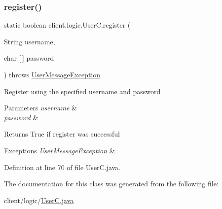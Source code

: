 \subsubsection{\texorpdfstring{register()}{register()}}
{\footnotesize\ttfamily static boolean client.\+logic.\+User\+C.\+register (\begin{DoxyParamCaption}\item[{String}]{username,  }\item[{char \mbox{[}$\,$\mbox{]}}]{password }\end{DoxyParamCaption}) throws \hyperlink{classsharedlib_1_1exceptions_1_1_user_message_exception}{User\+Message\+Exception}\hspace{0.3cm}{\ttfamily [static]}}

Register using the specified username and password


\begin{DoxyParams}{Parameters}
{\em username} & \\
\hline
{\em password} & \\
\hline
\end{DoxyParams}
\begin{DoxyReturn}{Returns}
True if register was successful 
\end{DoxyReturn}

\begin{DoxyExceptions}{Exceptions}
{\em User\+Message\+Exception} & \\
\hline
\end{DoxyExceptions}


Definition at line 70 of file User\+C.\+java.



The documentation for this class was generated from the following file\+:\begin{DoxyCompactItemize}
\item 
client/logic/\hyperlink{_user_c_8java}{User\+C.\+java}\end{DoxyCompactItemize}
